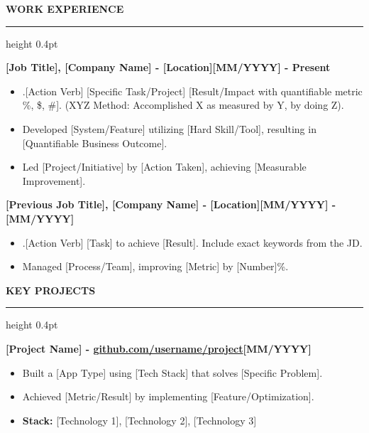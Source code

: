 \documentclass[a4paper,10pt]{article}
\newcommand{\cventry}[2]{\noindent\begin{minipage}[t]{\linewidth}\textbf{#1}\hfill\textbf{#2}\end{minipage}}
\newcommand{\mysection}[1]{%
  \vspace{0.3ex}
  {\bfseries\scshape\color{myblue} #1}\enspace%
  \leaders\hrule height 0.4pt\hfill\kern0pt
  \vspace{-0.2em}
}
\begin{document}
\mysection{WORK EXPERIENCE}

\cventry{[Job Title], [Company Name] - [Location]}{[MM/YYYY] - Present}
\begin{itemize}
    \item .[Action Verb] [Specific Task/Project] [Result/Impact with quantifiable metric \%, \$, \#]. (XYZ Method: Accomplished X as measured by Y, by doing Z).
    \item Developed [System/Feature] utilizing [Hard Skill/Tool], resulting in [Quantifiable Business Outcome].
    \item Led [Project/Initiative] by [Action Taken], achieving [Measurable Improvement].
\end{itemize}

\vspace{0.2em}
\cventry{[Previous Job Title], [Company Name] - [Location]}{[MM/YYYY] - [MM/YYYY]}
\begin{itemize}
    \item .[Action Verb] [Task] to achieve [Result]. Include exact keywords from the JD.
    \item Managed [Process/Team], improving [Metric] by [Number]\%.
\end{itemize}

\mysection{KEY PROJECTS}
\vspace{0.2em}

\cventry{\textbf{[Project Name]} - \href{https://github.com/username/project}{github.com/username/project}}{[MM/YYYY]}
\begin{itemize}
    \item Built a [App Type] using [Tech Stack] that solves [Specific Problem].
    \item Achieved [Metric/Result] by implementing [Feature/Optimization].
    \item \textbf{Stack:} [Technology 1], [Technology 2], [Technology 3]
\end{itemize}
\end{document}
